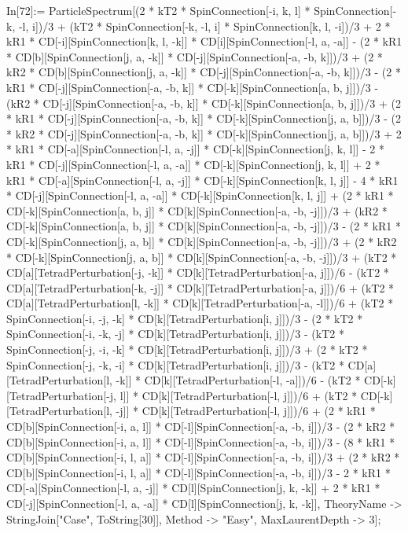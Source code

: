 In[72]:= ParticleSpectrum[(2 * kT2 * SpinConnection[-i, k, l] * SpinConnection[-k, -l, i])/3 + (kT2 * SpinConnection[-k, -l, i] * SpinConnection[k, l, -i])/3 + 2 * kR1 * CD[-i][SpinConnection[k, l, -k]] * CD[i][SpinConnection[-l, a, -a]] - (2 * kR1 * CD[b][SpinConnection[j, a, -k]] * CD[-j][SpinConnection[-a, -b, k]])/3 + (2 * kR2 * CD[b][SpinConnection[j, a, -k]] * CD[-j][SpinConnection[-a, -b, k]])/3 - (2 * kR1 * CD[-j][SpinConnection[-a, -b, k]] * CD[-k][SpinConnection[a, b, j]])/3 - (kR2 * CD[-j][SpinConnection[-a, -b, k]] * CD[-k][SpinConnection[a, b, j]])/3 + (2 * kR1 * CD[-j][SpinConnection[-a, -b, k]] * CD[-k][SpinConnection[j, a, b]])/3 - (2 * kR2 * CD[-j][SpinConnection[-a, -b, k]] * CD[-k][SpinConnection[j, a, b]])/3 + 2 * kR1 * CD[-a][SpinConnection[-l, a, -j]] * CD[-k][SpinConnection[j, k, l]] - 2 * kR1 * CD[-j][SpinConnection[-l, a, -a]] * CD[-k][SpinConnection[j, k, l]] + 2 * kR1 * CD[-a][SpinConnection[-l, a, -j]] * CD[-k][SpinConnection[k, l, j]] - 4 * kR1 * CD[-j][SpinConnection[-l, a, -a]] * CD[-k][SpinConnection[k, l, j]] + (2 * kR1 * CD[-k][SpinConnection[a, b, j]] * CD[k][SpinConnection[-a, -b, -j]])/3 + (kR2 * CD[-k][SpinConnection[a, b, j]] * CD[k][SpinConnection[-a, -b, -j]])/3 - (2 * kR1 * CD[-k][SpinConnection[j, a, b]] * CD[k][SpinConnection[-a, -b, -j]])/3 + (2 * kR2 * CD[-k][SpinConnection[j, a, b]] * CD[k][SpinConnection[-a, -b, -j]])/3 + (kT2 * CD[a][TetradPerturbation[-j, -k]] * CD[k][TetradPerturbation[-a, j]])/6 - (kT2 * CD[a][TetradPerturbation[-k, -j]] * CD[k][TetradPerturbation[-a, j]])/6 + (kT2 * CD[a][TetradPerturbation[l, -k]] * CD[k][TetradPerturbation[-a, -l]])/6 + (kT2 * SpinConnection[-i, -j, -k] * CD[k][TetradPerturbation[i, j]])/3 - (2 * kT2 * SpinConnection[-i, -k, -j] * CD[k][TetradPerturbation[i, j]])/3 - (kT2 * SpinConnection[-j, -i, -k] * CD[k][TetradPerturbation[i, j]])/3 + (2 * kT2 * SpinConnection[-j, -k, -i] * CD[k][TetradPerturbation[i, j]])/3 - (kT2 * CD[a][TetradPerturbation[l, -k]] * CD[k][TetradPerturbation[-l, -a]])/6 - (kT2 * CD[-k][TetradPerturbation[-j, l]] * CD[k][TetradPerturbation[-l, j]])/6 + (kT2 * CD[-k][TetradPerturbation[l, -j]] * CD[k][TetradPerturbation[-l, j]])/6 + (2 * kR1 * CD[b][SpinConnection[-i, a, l]] * CD[-l][SpinConnection[-a, -b, i]])/3 - (2 * kR2 * CD[b][SpinConnection[-i, a, l]] * CD[-l][SpinConnection[-a, -b, i]])/3 - (8 * kR1 * CD[b][SpinConnection[-i, l, a]] * CD[-l][SpinConnection[-a, -b, i]])/3 + (2 * kR2 * CD[b][SpinConnection[-i, l, a]] * CD[-l][SpinConnection[-a, -b, i]])/3 - 2 * kR1 * CD[-a][SpinConnection[-l, a, -j]] * CD[l][SpinConnection[j, k, -k]] + 2 * kR1 * CD[-j][SpinConnection[-l, a, -a]] * CD[l][SpinConnection[j, k, -k]], TheoryName -> StringJoin["Case", ToString[30]], Method -> "Easy", MaxLaurentDepth -> 3]; 